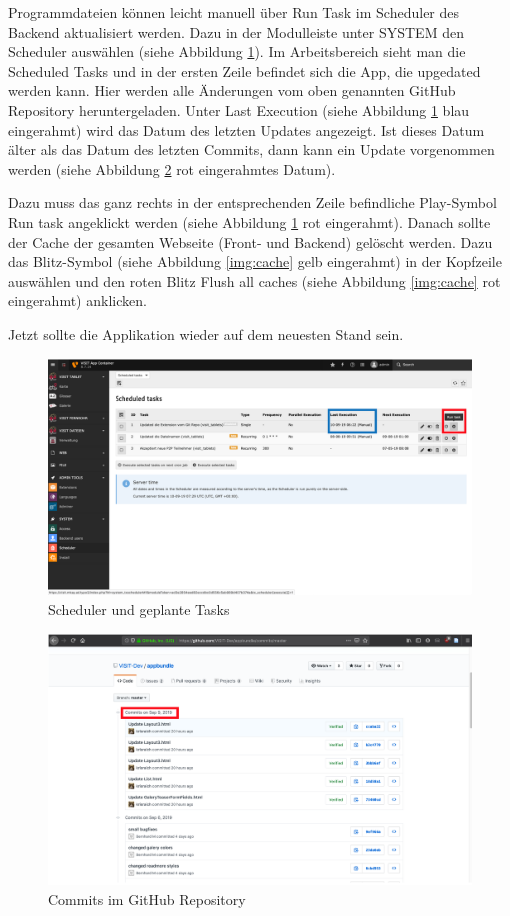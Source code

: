 Programmdateien können leicht manuell über \glqq Run Task\grqq{} im Scheduler des Backend aktualisiert werden.
Dazu in der Modulleiste unter SYSTEM den \glqq Scheduler\grqq{} auswählen  (siehe Abbildung \ref{img:scheduler}). Im Arbeitsbereich sieht man die \glqq Scheduled Tasks\grqq{} und in der ersten Zeile befindet sich die App, die upgedated werden kann. Hier werden alle Änderungen vom oben genannten GitHub Repository heruntergeladen. Unter \glqq Last Execution\grqq{} (siehe Abbildung \ref{img:scheduler} blau eingerahmt) wird das Datum des letzten Updates angezeigt. Ist dieses Datum älter als das Datum des letzten Commits, dann kann ein Update vorgenommen werden (siehe Abbildung \ref{img:commits} rot eingerahmtes Datum).

Dazu muss das ganz rechts in der entsprechenden Zeile befindliche Play-Symbol \glqq Run task\grqq{} angeklickt werden (siehe Abbildung \ref{img:scheduler} rot eingerahmt). Danach sollte der Cache der gesamten Webseite (Front- und Backend) gelöscht werden. Dazu das Blitz-Symbol (siehe Abbildung \ref{img:cache} gelb eingerahmt) in der Kopfzeile auswählen und den roten Blitz \glqq Flush all caches \grqq{} (siehe Abbildung \ref{img:cache} rot eingerahmt) anklicken.

Jetzt sollte die Applikation wieder auf dem neuesten Stand sein.

\begin{figure}[ht!]
\centering
\includegraphics[width=12cm]{Figures/paula/update_prozess/run_task.png}
\caption{Scheduler und geplante Tasks}
\label{img:scheduler}
\end{figure}

\begin{figure}[ht!]
\centering
\includegraphics[width=12cm]{Figures/paula/update_prozess/commits.png}
\caption{Commits im GitHub Repository}
\label{img:commits}
\end{figure}

